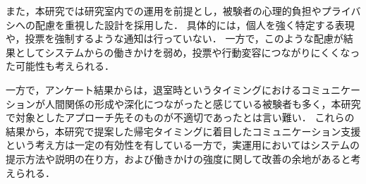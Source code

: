 また，本研究では研究室内での運用を前提とし，被験者の心理的負担やプライバシへの配慮を重視した設計を採用した．
具体的には，個人を強く特定する表現や，投票を強制するような通知は行っていない．
一方で，このような配慮が結果としてシステムからの働きかけを弱め，投票や行動変容につながりにくくなった可能性も考えられる．


一方で，アンケート結果からは，退室時というタイミングにおけるコミュニケーションが人間関係の形成や深化につながったと感じている被験者も多く，本研究で対象としたアプローチ先そのものが不適切であったとは言い難い．
これらの結果から，本研究で提案した帰宅タイミングに着目したコミュニケーション支援という考え方は一定の有効性を有している一方で，実運用においてはシステムの提示方法や説明の在り方，および働きかけの強度に関して改善の余地があると考えられる．


